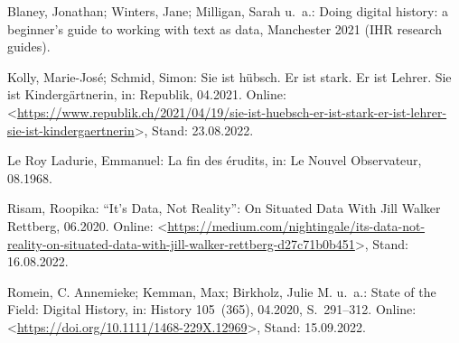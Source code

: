 \documentclass[
  letterpaper,
]{book}
\newlength{\cslhangindent}
\newlength{\cslentryspacingunit} %
\newenvironment{CSLReferences}[2] %
 {%
  \setlength{\parindent}{0pt}
  \ifodd #1
  \let\oldpar\par
  \def\par{\hangindent=\cslhangindent\oldpar}
  \fi
  \setlength{\parskip}{#2\cslentryspacingunit}
 }%
 {}
\begin{document}
\hypertarget{refs}{}
\begin{CSLReferences}{0}{0}
\leavevmode{}%
Blaney, Jonathan; Winters, Jane; Milligan, Sarah u.~a.: Doing digital
history: a beginner's guide to working with text as data, Manchester
2021 ({IHR} research guides).

\leavevmode{}%
Kolly, Marie-José; Schmid, Simon: Sie ist h{ü}bsch. {Er} ist stark. {Er}
ist {Lehrer}. {Sie} ist {Kinderg{ä}rtnerin}, in: Republik, 04.2021.
Online:
\textless{}\url{https://www.republik.ch/2021/04/19/sie-ist-huebsch-er-ist-stark-er-ist-lehrer-sie-ist-kindergaertnerin}\textgreater,
Stand: 23.08.2022.

\leavevmode{}%
Le Roy Ladurie, Emmanuel: La fin des {é}rudits, in: Le Nouvel
Observateur, 08.1968.

\leavevmode{}%
Risam, Roopika: {``}{It}{'}s {Data}, {Not} {Reality}{''}: {On}
{Situated} {Data} {With} {Jill} {Walker} {Rettberg}, 06.2020. Online:
\textless{}\url{https://medium.com/nightingale/its-data-not-reality-on-situated-data-with-jill-walker-rettberg-d27c71b0b451}\textgreater,
Stand: 16.08.2022.

\leavevmode{}%
Romein, C. Annemieke; Kemman, Max; Birkholz, Julie M. u.~a.: State of
the {Field}: {Digital} {History}, in: History 105~(365), 04.2020,
S.~291--312. Online:
\textless{}\url{https://doi.org/10.1111/1468-229X.12969}\textgreater,
Stand: 15.09.2022.

\end{CSLReferences}


\backmatter
\end{document}
